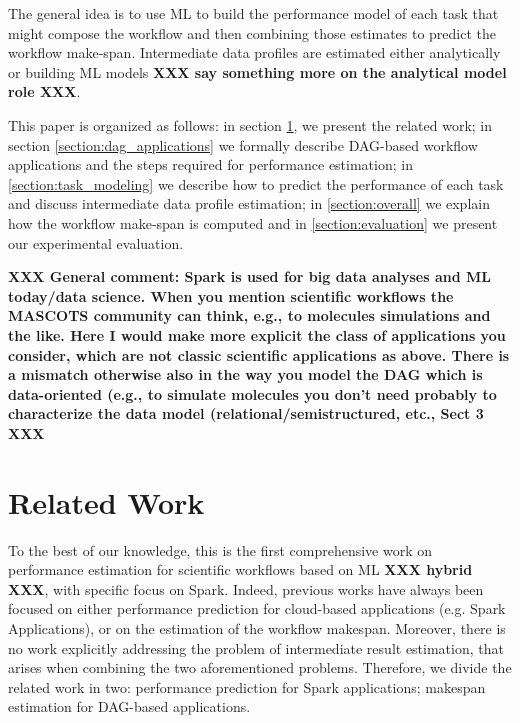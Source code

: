 \documentclass[a4paper, 10pt, conference]{ieeeconf}      %
\begin{document}
The general idea is to use ML to build the performance model of each task that might compose the workflow and then combining those estimates to predict the workflow make-span. Intermediate data profiles are estimated either analytically or building ML models \textbf{XXX say something more on the analytical model role XXX}.

This paper is organized as follows: in section \ref{section:related_work}, we present the related work; in section \ref{section:dag_applications} we formally describe DAG-based workflow applications and the steps required for performance estimation; in \ref{section:task_modeling} we describe how to predict the performance of each task and discuss intermediate data profile estimation; in \ref{section:overall} we explain how the workflow make-span is computed and in \ref{section:evaluation} we present our experimental evaluation.

\textbf{XXX General comment:  Spark is used for big data analyses and ML today/data science.  When you mention scientific workflows the MASCOTS community can think, e.g., to molecules simulations and the like.  Here I would make more explicit the class of applications you consider, which are not classic scientific applications as above.  There is a mismatch otherwise also in the way you model the DAG which is data-oriented (e.g., to simulate molecules you don't need probably to characterize the data model (relational/semistructured, etc., Sect 3 XXX} 



\section{Related Work}
\label{section:related_work}
To the best of our knowledge, this is the first comprehensive work on performance estimation for scientific workflows based on ML \textbf{XXX hybrid XXX}, with specific focus on Spark. Indeed, previous works have always been focused on either performance prediction for cloud-based applications (e.g. Spark Applications), or on the estimation of the workflow makespan. Moreover, there is no work explicitly addressing the problem of intermediate result estimation, that arises when combining the two aforementioned problems. 
Therefore, we divide the related work in two: performance prediction for Spark applications; makespan estimation for DAG-based applications. 
\end{document}
